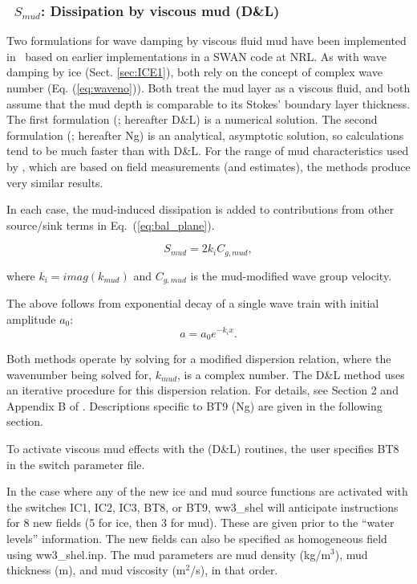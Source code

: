 \vsssub
\subsubsection{~$S_{mud}$: Dissipation by viscous mud (D\&L)} \label{sec:BT8}
\vsssub


\noindent
Two formulations for wave damping by viscous fluid mud have been implemented
in \ws\, based on earlier implementations in a SWAN code at NRL.  As with wave
damping by ice (Sect. \ref{sec:ICE1}), both rely on the concept of complex
wave number (Eq. (\ref{eq:waveno})). Both treat the mud layer as a viscous
fluid, and both assume that the mud depth is comparable to its Stokes'
boundary layer thickness. The first formulation (\cite{art:DL78}; hereafter
D\&L) is a numerical solution.  The second formulation (\cite{art:Ng00};
hereafter Ng) is an analytical, asymptotic solution, so calculations tend to
be much faster than with D\&L. For the range of mud characteristics used by
\cite{art:RH09}, which are based on field measurements (and estimates),
the methods produce very similar results.

In each case, the mud-induced dissipation is added to contributions from other
source/sink terms in Eq.~(\ref{eq:bal_plane}).

\begin{equation}\label{eq:dmud1}
  {S_{mud}} = 2  k_i {C_{g,mud}},
\end{equation}

\noindent
where $k_i=imag({k_{mud}})$ and ${C_{g,mud}}$ is the mud-modified wave group
velocity.

The above follows from exponential decay of a single wave train with initial
amplitude $a_0$:
\begin{equation}\label{eq:dmud2}
 a=a_0e^{-k_ix}.
\end{equation}

\noindent
Both methods operate by solving for a modified dispersion relation, where the
wavenumber being solved for, ${k_{mud}}$, is a complex number. The D\&L method
uses an iterative procedure for this dispersion relation. For details, see
Section 2 and Appendix B of \cite{art:DL78}. Descriptions specific to {\code
BT9} (Ng) are given in the following section.

To activate viscous mud effects with the (D\&L) routines, the user specifies
{\code BT8} in the switch parameter file.

In the case where any of the new ice and mud source functions are activated
with the switches {\code IC1}, {\code IC2}, {\code IC3}, {\code BT8}, or
{\code BT9}, {\file ww3\_shel} will anticipate instructions for 8 new fields
(5 for ice, then 3 for mud). These are given prior to the ``water levels''
information. The new fields can also be specified as homogeneous field using
{\file ww3\_shel.inp}. The mud parameters are mud density (kg/m$^3$), mud
thickness (m), and mud viscosity (m$^2$/s), in that order.

